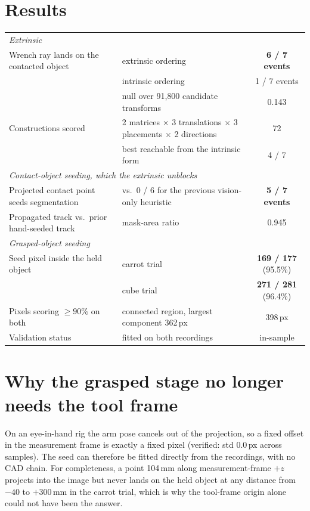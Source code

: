 \documentclass[10pt,a4paper]{article}
\begin{document}
\section{Results}
\begin{center}\small
\begin{tabular}{llc}
\toprule
\multicolumn{3}{l}{\textit{Extrinsic}}\\
Wrench ray lands on the contacted object & extrinsic ordering & \textbf{6 / 7 events}\\
 & intrinsic ordering & 1 / 7 events\\
 & null over 91{,}800 candidate transforms & 0.143\\
Constructions scored & 2 matrices $\times$ 3 translations $\times$ 3 placements $\times$ 2 directions & 72\\
 & best reachable from the intrinsic form & 4 / 7\\
\midrule
\multicolumn{3}{l}{\textit{Contact-object seeding, which the extrinsic unblocks}}\\
Projected contact point seeds segmentation & vs.\ 0 / 6 for the previous vision-only heuristic & \textbf{5 / 7 events}\\
Propagated track vs.\ prior hand-seeded track & mask-area ratio & 0.945\\
\midrule
\multicolumn{3}{l}{\textit{Grasped-object seeding}}\\
Seed pixel inside the held object & carrot trial & \textbf{169 / 177} (95.5\%)\\
 & cube trial & \textbf{271 / 281} (96.4\%)\\
Pixels scoring $\ge 90\%$ on both & connected region, largest component 362\,px & 398\,px\\
Validation status & fitted on both recordings & in-sample\\
\bottomrule
\end{tabular}
\end{center}

\section{Why the grasped stage no longer needs the tool frame}
On an eye-in-hand rig the arm pose cancels out of the projection, so a fixed offset in the
measurement frame is exactly a fixed pixel (verified: std $0.0$\,px across samples). The seed can
therefore be fitted directly from the recordings, with no CAD chain. For completeness, a point
104\,mm along measurement-frame $+z$ projects into the image but never lands on the held object at
any distance from $-40$ to $+300$\,mm in the carrot trial, which is why the tool-frame origin alone
could not have been the answer.
\end{document}
